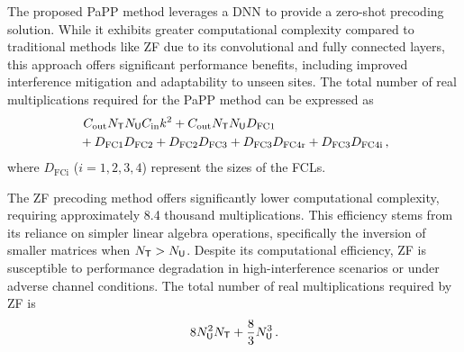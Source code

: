 The proposed PaPP method leverages a DNN to provide a zero-shot precoding solution. While it exhibits greater computational complexity compared to traditional methods like ZF due to its convolutional and fully connected layers, this approach offers significant performance benefits, including improved interference mitigation and adaptability to unseen sites. The total number of real multiplications required for the PaPP method can be expressed as
\begin{align*}
 & \ C_{\text{out}}N_{\sf{T}}N_{\sf{U}}C_{\text{in}}k^2 + C_{\text{out}}N_{\sf{T}}N_{\sf{U}}D_{\text{FC1}} \\
& +D_{\text{FC1}}D_{\text{FC2}} + D_{\text{FC2}}D_{\text{FC3}} + D_{\text{FC3}}D_{\text{FC4r}} + D_{\text{FC3}}D_{\text{FC4i}}\, ,
\end{align*}
where $D_{\text{FCi}}$ ($i=1,2,3,4$) represent the sizes of the \glspl{FCL}. 

The \gls{ZF} \cite{nayebi2017precoding} precoding method offers significantly lower computational complexity, requiring approximately 8.4 thousand multiplications. This efficiency stems from its reliance on simpler linear algebra operations, specifically the inversion of smaller matrices when $N_{\sf{T}}>N_{\sf{U}}$. Despite its computational efficiency, ZF is susceptible to performance degradation in high-interference scenarios or under adverse channel conditions. The total number of real multiplications required by ZF is
\[
8 N_{\sf{U}}^2 N_{\sf{T}} + \frac{8}{3} N_{\sf{U}}^3 \, .
\]